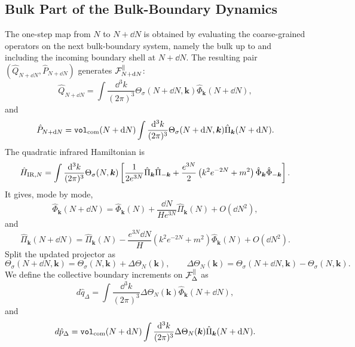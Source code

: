 \documentclass{article}
\def\cF{{\cal F}}
\newcommand{\VF}{\mathtt{vol}_{\rm com}}
\newcommand{\hvarphi}{\hat{\Phi}}
\newcommand{\hpi}{\hat{\Pi}}
\numberwithin{equation}{section}
\begin{document}
	\subsection{Bulk Part of the Bulk-Boundary Dynamics}
	\label{appA:Bulk}

	The one-step map from \(N\) to \(N+\dd N\) is obtained by evaluating the coarse-grained operators on the next bulk-boundary system, namely the bulk up to and including the incoming boundary shell at \(N+\dd N\). The resulting pair \((\hat Q_{N+\dd N},\hat P_{N+\dd N})\) generates \(\cF_{N+\dd N}^\parallel\):
	\begin{equation}
		\hat Q_{N+\dd N} = \int \frac{\dd^3k}{(2\pi)^3} \Theta_\sigma(N+\dd N,\bm k)\hvarphi_{\bm k}(N+\dd N),
	\end{equation}
	and
	\begin{equation}
		\hat P_{N+\dd N} = \VF(N+\dd N) \int \frac{\dd^3k}{(2\pi)^3} \Theta_\sigma(N+\dd N,\bm k)\hpi_{\bm k}(N+\dd N).
	\end{equation}
	The quadratic infrared Hamiltonian is
	\begin{equation}
		\hat H_{{\rm IR},N} = \int \frac{\dd^3k}{(2\pi)^3} \Theta_\sigma(N,\bm k) \left[ \frac{1}{2e^{3N}}\hpi_{\bm k}\hpi_{-\bm k} + \frac{e^{3N}}{2} \left( k^2e^{-2N}+m^2 \right) \hvarphi_{\bm k}\hvarphi_{-\bm k} \right].
	\end{equation}
	It gives, mode by mode,
	\begin{equation}
		\hvarphi_{\bm k}(N+\dd N) = \hvarphi_{\bm k}(N) + \frac{\dd N}{H e^{3N}}\hpi_{\bm k}(N) + O(\dd N^2),
	\end{equation}
	and
	\begin{equation}
		\hpi_{\bm k}(N+\dd N) = \hpi_{\bm k}(N) - \frac{e^{3N}\dd N}{H} \left( k^2e^{-2N}+m^2 \right) \hvarphi_{\bm k}(N) + O(\dd N^2).
	\end{equation}
	Split the updated projector as
	\begin{equation}
		\Theta_\sigma(N+\dd N,\bm k) = \Theta_\sigma(N,\bm k) + \Delta\Theta_N(\bm k), \qquad \Delta\Theta_N(\bm k) = \Theta_\sigma(N+\dd N,\bm k) - \Theta_\sigma(N,\bm k).
	\end{equation}
	We define the collective boundary increments on \(\cF_{\Delta}^\parallel\) as
	\begin{equation}
		d\hat q_{\Delta} = \int\frac{\dd^3k}{(2\pi)^3} \Delta\Theta_N(\bm k)\hvarphi_{\bm k}(N+\dd N),
		\label{eq:dQDeltaExactApp}
	\end{equation}
	and
	\begin{equation}
		d\hat p_{\Delta} = \VF(N+\dd N) \int\frac{\dd^3k}{(2\pi)^3} \Delta\Theta_N(\bm k)\hpi_{\bm k}(N+\dd N).
		\label{eq:dPDeltaExactApp}
	\end{equation}
\end{document}
